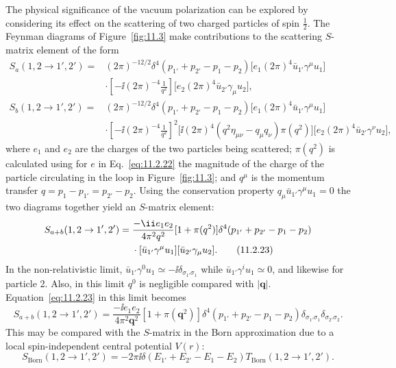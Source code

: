 The physical significance of the vacuum polarization can be explored by
considering its effect on the scattering of two charged particles of spin
$\tfrac12$. The Feynman diagrams of Figure~\ref{fig:11.3} make contributions to the
scattering $S$-matrix element of the form
\begin{align*}
  S_a(1,2\to1',2')={}&(2\pi)^{-12/2}\delta^4(p_{1'}+p_{2'}-p_1-p_2)
  \bigl[e_1(2\pi)^4\bar u_{1'}\gamma^\mu u_1\bigr]\\
  &\cdot\left[-\ii(2\pi)^{-4}\frac1{q^2}\right]
  \bigl[e_2(2\pi)^4\bar u_{2'}\gamma_\mu u_2\bigr],\\[4pt]
  S_b(1,2\to1',2')={}&(2\pi)^{-12/2}\delta^4(p_{1'}+p_{2'}-p_1-p_2)
  \bigl[e_1(2\pi)^4\bar u_{1'}\gamma^\mu u_1\bigr]\\
  &\cdot\left[-\ii(2\pi)^{-4}\frac1{q^2}\right]^2
  \bigl[\ii(2\pi)^4(q^2\eta_{\mu\nu}-q_\mu q_\nu)\pi(q^2)\bigr]
  \bigl[e_2(2\pi)^4\bar u_{2'}\gamma^\nu u_2\bigr],
\end{align*}
where $e_1$ and $e_2$ are the charges of the two particles being scattered;
$\pi(q^2)$ is calculated using for $e$ in Eq.~\eqref{eq:11.2.22} the magnitude of
the charge of the particle circulating in the loop in Figure~\ref{fig:11.3}; and
$q^\mu$ is the momentum transfer $q=p_1-p_{1'}=p_{2'}-p_2$. Using the
conservation property $q_\mu\bar u_{1'}\gamma^\mu u_1=0$ the two diagrams
together yield an $S$-matrix element:
\begin{align}
  S_{a+b}(1,2\to1',2')={}&\frac{-\ii e_1e_2}{4\pi^2q^2}
  [1+\pi(q^2)]\delta^4(p_{1'}+p_{2'}-p_1-p_2)\notag\\
  &\cdot[\bar u_{1'}\gamma^\mu u_1][\bar u_{2'}\gamma_\mu u_2].
  \tag{11.2.23}\label{eq:11.2.23}
\end{align}
In the non-relativistic limit,
$\bar u_{1'}\gamma^0u_1\simeq-\ii\delta_{\sigma_{1'}\sigma_1}$ while
$\bar u_{1'}\gamma^iu_1\simeq0$, and likewise for particle 2. Also, in this
limit $q^0$ is negligible compared with $|\mathbf q|$. Equation~\eqref{eq:11.2.23}
in this limit becomes
\begin{equation}
  S_{a+b}(1,2\to1',2')=\frac{-\ii e_1e_2}{4\pi^2\mathbf q^2}
  [1+\pi(\mathbf q^2)]\delta^4(p_{1'}+p_{2'}-p_1-p_2)
  \delta_{\sigma_{1'}\sigma_1}\delta_{\sigma_{2'}\sigma_2}.
  \tag{11.2.24}\label{eq:11.2.24}
\end{equation}
This may be compared with the $S$-matrix in the Born approximation due
to a local spin-independent central potential $V(r)$:
\begin{equation}
  S_{\mathrm{Born}}(1,2\to1',2')=-2\pi \ii\delta(E_{1'}+E_{2'}-E_1-E_2)
  T_{\mathrm{Born}}(1,2\to1',2').
  \tag{11.2.25}\label{eq:11.2.25}
\end{equation}
